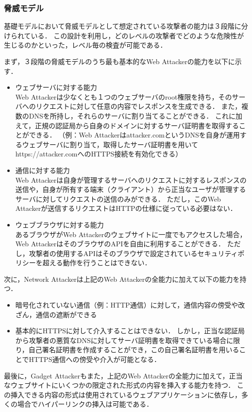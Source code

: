 \documentclass[12pt,a4paper]{jbook}
\begin{document}
\subsubsection{脅威モデル}
基礎モデルにおいて脅威モデルとして想定されている攻撃者の能力は３段階に分けられている．
この設計を利用し，どのレベルの攻撃者でどのような危険性が生じるのかといった，レベル毎の検査が可能である．

まず，３段階の脅威モデルのうち最も基本的なWeb Attackerの能力を以下に示す．
\begin{itemize}
\item ウェブサーバに対する能力 \\
Web Attackerは少なくとも１つのウェブサーバのroot権限を持ち，そのサーバへのリクエストに対して任意の内容でレスポンスを生成できる．
また，複数のDNSを所持し，それらのサーバに割り当てることができる．
これに加えて，正規の認証局から自身のドメインに対するサーバ証明書を取得することができる．
（例：Web Attackerはattacker.comというDNSを自身が運用するウェブサーバに割り当て，取得したサーバ証明書を用いてhttps://attacker.comへのHTTPS接続を有効化できる）
\item 通信に対する能力 \\
Web Attackerは自身が管理するサーバへのリクエストに対するレスポンスの送信や，自身が所有する端末（クライアント）から正当なユーザが管理するサーバに対してリクエストの送信のみができる．
ただし，このWeb Attackerが送信するリクエストはHTTPの仕様に従っている必要はない．
\item ウェブブラウザに対する能力 \\
あるブラウザがWeb Attackerのウェブサイトに一度でもアクセスした場合，Web AttackerはそのブラウザのAPIを自由に利用することができる．
ただし，攻撃者の使用するAPIはそのブラウザで設定されているセキュリティポリシーを超える動作を行うことはできない．
\end{itemize}

次に，Network Attackerは上記のWeb Attackerの全能力に加えて以下の能力を持つ．
\begin{itemize}
\item 暗号化されていない通信（例：HTTP通信）に対して，通信内容の傍受や改ざん，通信の遮断ができる
\item 基本的にHTTPSに対して介入することはできない．
しかし，正当な認証局から攻撃者の悪質なDNSに対してサーバ証明書を取得できている場合に限り，自己署名証明書を作成することができ，この自己署名証明書を用いることでHTTPS通信への傍受や介入が可能となる．
\end{itemize}

最後に，Gadget Attackerもまた，上記のWeb Attackerの全能力に加えて，正当なウェブサイトにいくつかの限定された形式の内容を挿入する能力を持つ．
この挿入できる内容の形式は使用されているウェブアプリケーションに依存し，多くの場合でハイパーリンクの挿入は可能である．
\end{document}
